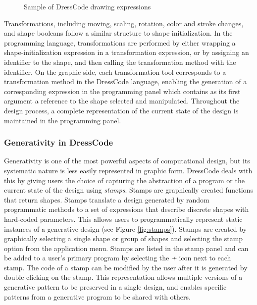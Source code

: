 \documentclass{sigchi}
\begin{document}
\begin{figure}
\begin{center}
\caption{Sample of DressCode drawing expressions}
\label{fig:syntax}
\end{center}
\end{figure}

Transformations, including moving, scaling, rotation, color and stroke changes, and shape booleans follow a similar structure to shape initialization. In the programming language, transformations are performed by either wrapping a shape-initialization expression in a transformation expression, or by assigning an identifier to the shape, and then calling the transformation method with the identifier. On the graphic side, each transformation tool corresponds to a transformation method in the DressCode language, enabling the generation of a corresponding expression in the programming panel which contains as its first argument a reference to the shape selected and manipulated. Throughout the design process, a complete representation of the current state of the design is maintained in the programming panel.

\subsubsection{Generativity in DressCode}
Generativity is one of the most powerful aspects of computational design, but its systematic nature is less easily represented in graphic form. DressCode deals with this by giving users the choice of capturing the abstraction of a program or the current state of the design using \textit{stamps}. Stamps are graphically created functions that return shapes. Stamps translate a design generated by random programmatic methods to a set of expressions that describe discrete shapes with hard-coded parameters. This allows users to programmatically represent static instances of a generative design (see Figure \ref{fig:stamps}). Stamps are created by graphically selecting a single shape or group of shapes and selecting the stamp option from the application menu. Stamps are listed in the stamp panel and can be added to a user's primary program by selecting the \textit{+} icon next to each stamp. The code of a stamp can be modified by the user after it is generated by double clicking on the stamp. This representation allows multiple versions of a generative pattern to be preserved in a single design, and enables specific patterns from a generative program to be shared with others.
\end{document}
